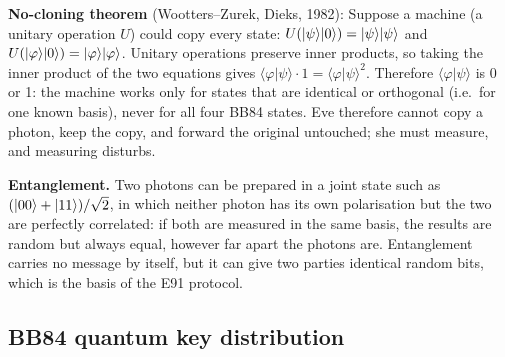 \textbf{No-cloning theorem} (Wootters--Zurek, Dieks, 1982):  Suppose a machine (a unitary operation $U$) could copy every state: $U(\lvert \psi\rangle\lvert 0\rangle) = \lvert \psi\rangle\lvert \psi\rangle$ and $U(\lvert \varphi\rangle\lvert 0\rangle) = \lvert \varphi\rangle\lvert \varphi\rangle$. Unitary operations preserve inner products, so taking the inner product of the two equations gives $\langle\varphi|\psi\rangle \cdot 1 = \langle\varphi|\psi\rangle^2$. Therefore $\langle\varphi|\psi\rangle$ is 0 or 1: the machine works only for states that are identical or orthogonal (i.e.\ for one known basis), never for all four BB84 states. Eve therefore cannot copy a photon, keep the copy, and forward the original untouched; she must measure, and measuring disturbs.

\textbf{Entanglement.} Two photons can be prepared in a joint state such as $(\lvert 00\rangle + \lvert 11\rangle)/\sqrt 2$, in which neither photon has its own polarisation but the two are perfectly correlated: if both are measured in the same basis, the results are random but always equal, however far apart the photons are. Entanglement carries no message by itself, but it can give two parties identical random bits, which is the basis of the E91 protocol.

\subsection{BB84 quantum key distribution \hot\new}

